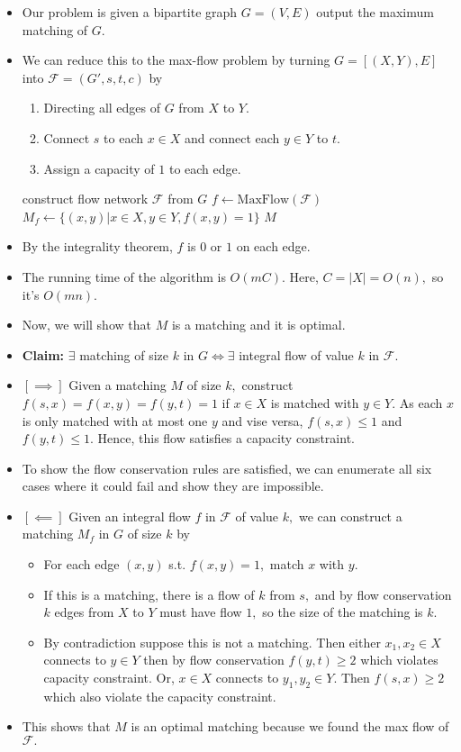 \documentclass[a4paper,12pt]{article}
\begin{document}
\begin{itemize}
    \item Our problem is given a bipartite graph $G=(V,E)$ output the maximum matching of $G.$
    \item We can reduce this to the max-flow problem by turning $G=[(X,Y),E]$ into $\mathcal F=(G',s,t,c)$ by \begin{enumerate}
        \item Directing all edges of $G$ from $X$ to $Y.$
        \item Connect $s$ to each $x\in X$ and connect each $y\in Y$ to $t.$
        \item Assign a capacity of $1$ to each edge.
    \end{enumerate}
    \begin{algorithmic}[1]
        \State construct flow network $\mathcal F$ from $G$
        \State $f\gets\mathrm{MaxFlow}(\mathcal F)$
        \State $M_f\gets\{(x,y)|x\in X,y\in Y, f(x,y)=1\}$
        \State \Return $M$
        \EndProcedure
    \end{algorithmic}
    \item By the integrality theorem, $f$ is $0$ or $1$ on each edge.
    \item The running time of the algorithm is $O(mC).$ Here, $C=|X|=O(n),$ so it's $O(mn).$
    \item Now, we will show that $M$ is a matching and it is optimal.
    \item \textbf{Claim:} $\exists$ matching of size $k$ in $G\iff\exists$ integral flow of value $k$ in $\mathcal F.$
    \item $[\implies]$ Given a matching $M$ of size $k,$ construct $f(s,x)=f(x,y)=f(y,t)=1$ if $x\in X$ is matched with $y\in Y.$ As each $x$ is only matched with at most one $y$ and vise versa, $f(s,x)\leq1$ and $f(y,t)\leq1.$ Hence, this flow satisfies a capacity constraint.
    \item To show the flow conservation rules are satisfied, we can enumerate all six cases where it could fail and show they are impossible.
    \item $[\impliedby]$ Given an integral flow $f$ in $\mathcal F$ of value $k,$ we can construct a matching $M_f$ in $G$ of size $k$ by \begin{itemize}
        \item For each edge $(x,y)$ s.t. $f(x,y)=1,$ match $x$ with $y.$ 
        \item If this is a matching, there is a flow of $k$ from $s,$ and by flow conservation $k$ edges from $X$ to $Y$ must have flow $1,$ so the size of the matching is $k.$ 
        \item  By contradiction suppose this is not a matching. Then either $x_1,x_2\in X$ connects to $y\in Y$ then by flow conservation $f(y,t)\geq2$ which violates capacity constraint. Or, $x\in X$ connects to $y_1,y_2\in Y.$ Then $f(s,x)\geq2$ which also violate the capacity constraint.  
    \end{itemize}
    \item This shows that $M$ is an optimal matching because we found the max flow of $\mathcal F.$ 
\end{itemize}
\end{document}
